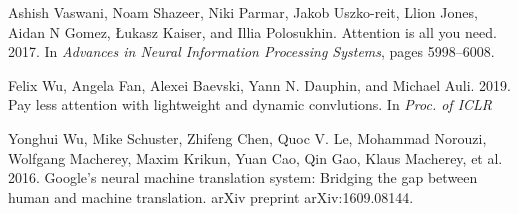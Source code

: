 \documentclass{article}
\begin{document}
\begin{enumerate}[label={[\arabic*]}, leftmargin=0.55cm]
  \item Ashish Vaswani, Noam Shazeer, Niki Parmar, Jakob Uszko-reit, Llion Jones, Aidan N Gomez, Łukasz Kaiser, and Illia Polosukhin. Attention is all you need. 2017. In \textit{Advances in Neural Information Processing Systems}, pages 5998–6008.
  \label{itm:transformer}

  \item Felix Wu, Angela Fan, Alexei Baevski, Yann N. Dauphin, and Michael Auli. 2019. Pay less attention with lightweight and dynamic convlutions. In \textit{Proc. of ICLR}
  \label{itm:pay_less_attention}

  \item Yonghui Wu, Mike Schuster, Zhifeng Chen, Quoc V. Le, Mohammad Norouzi, Wolfgang Macherey, Maxim Krikun, Yuan Cao, Qin Gao, Klaus Macherey, et al. 2016. Google’s neural machine translation system: Bridging the gap between human and machine translation. arXiv preprint arXiv:1609.08144.
  \label{itm:gnmt}

\end{enumerate}
\end{document}
